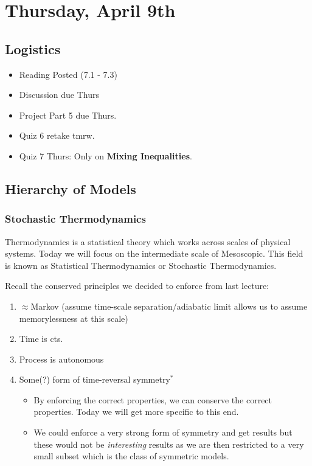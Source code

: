 \section{Thursday, April 9th}
\subsection{Logistics}
\begin{itemize}
    \item Reading Posted (7.1 - 7.3)
    \item Discussion due Thurs
    \item Project Part 5 due Thurs.
    \item Quiz 6 retake tmrw.
    \item Quiz 7 Thurs: Only on \textbf{Mixing Inequalities}.
\end{itemize}

\subsection{Hierarchy of Models}
\subsubsection{Stochastic Thermodynamics}
Thermodynamics is a statistical theory which works across scales of physical systems. Today we will focus on the intermediate scale of Mesoscopic. This field is known as Statistical Thermodynamics or Stochastic Thermodynamics.

Recall the conserved principles we decided to enforce from last lecture:
\begin{enumerate}
    \item $\approx$Markov (assume time-scale separation/adiabatic limit allows us to assume memorylessness at this scale)
    \item Time is cts.
    \item Process is autonomous
    \item Some(?) form of time-reversal symmetry$^\ast$
    \begin{itemize}
        \item By enforcing the correct properties, we can conserve the correct properties. Today we will get more specific to this end.
        \item We could enforce a very strong form of symmetry and get results but these would not be \textit{interesting} results as we are then restricted to a very small subset which is the class of symmetric models.
    \end{itemize}
\end{enumerate}

